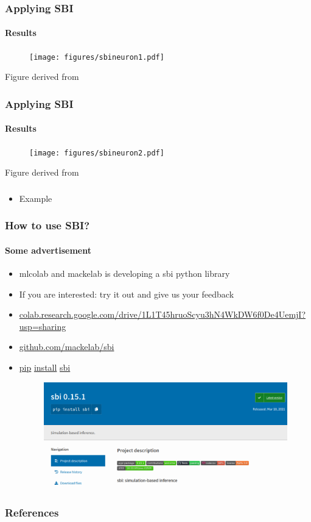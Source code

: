 \documentclass[9pt]{beamer}
\begin{document}

\begin{frame}
\frametitle{Applying SBI}
\framesubtitle{Results}
\begin{figure}
	\texttt{[image: figures/sbineuron1.pdf]}
\end{figure}
\vspace{50pt}
\tiny Figure derived from \cite{lueckmann2017flexible}
\end{frame}  
\begin{frame}
\frametitle{Applying SBI}
\framesubtitle{Results}
\begin{figure}
	\texttt{[image: figures/sbineuron2.pdf]}
\end{figure}
\vspace{50pt}
\tiny Figure derived from \cite{lueckmann2017flexible}
\end{frame}  



\begin{frame}
\frametitle{}
\framesubtitle{}
\begin{itemize}
	\item Example
\end{itemize}
\end{frame} 


\begin{frame}
\frametitle{How to use SBI?}
\framesubtitle{Some advertisement}
\begin{itemize}
	\item mlcolab and mackelab is developing a sbi python library
	\item If you are interested: try it out and give us your feedback
	\item \url{colab.research.google.com/drive/1L1T45hruoScyu3hN4WkDW6f0De4UemjI?usp=sharing}
	\item \url{github.com/mackelab/sbi}
	\item \url{pip} \url{install} \url{sbi}
		\begin{figure}
		\flushleft
		\includegraphics[width=.5\linewidth]{figures/sbipypi.png}
	\end{figure}
\end{itemize}
\end{frame} 


\begin{frame}
\frametitle{References}
\framesubtitle{}

\end{frame} 
\end{document}
